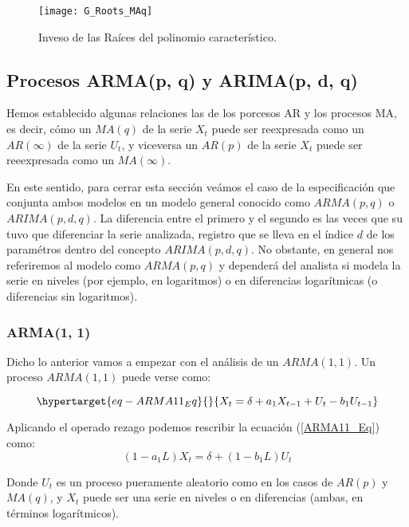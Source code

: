 \documentclass[
  a4paper,
]{article}
\begin{document}
\begin{figure}
  \centering
    \texttt{[image: G\_Roots\_MAq]}
  \caption{Inveso de las Raíces del polinomio característico.}
  \label{G_Roots_MAq}
\end{figure}

\hypertarget{procesos-armap-q-y-arimap-d-q}{%
\subsection{Procesos ARMA(p, q) y ARIMA(p, d,
q)}\label{procesos-armap-q-y-arimap-d-q}}

Hemos establecido algunas relaciones las de los porcesos AR y los
procesos MA, es decir, cómo un \(MA(q)\) de la serie \(X_t\) puede ser
reexpresada como un \(AR(\infty)\) de la serie \(U_t\), y viceversa un
\(AR(p)\) de la serie \(X_t\) puede ser reeexpresada como un
\(MA(\infty)\).

En este sentido, para cerrar esta sección veámos el caso de la
especificación que conjunta ambos modelos en un modelo general conocido
como \(ARMA(p, q)\) o \(ARIMA(p, d, q)\). La diferencia entre el primero
y el segundo es las veces que su tuvo que diferenciar la serie
analizada, registro que se lleva en el índice \(d\) de los paramétros
dentro del concepto \(ARIMA(p, d, q)\). No obstante, en general nos
referiremos al modelo como \(ARMA(p, q)\) y dependerá del analista si
modela la serie en niveles (por ejemplo, en logaritmos) o en diferencias
logarítmicas (o diferencias sin logaritmos).

\hypertarget{arma1-1}{%
\subsubsection{ARMA(1, 1)}\label{arma1-1}}

Dicho lo anterior vamos a empezar con el análisis de un \(ARMA(1, 1)\).
Un proceso \(ARMA(1, 1)\) puede verse como:

\begin{equation}\protect\hypertarget{eq-ARMA11_Eq}{}{
X_t = \delta + a_1 X_{t - 1} + U_t - b_1 U_{t - 1}
}\label{eq-ARMA11_Eq}\end{equation}

Aplicando el operado rezago podemos rescribir la ecuación
(\ref{ARMA11_Eq}) como: \[
(1 - a_1 L) X_t = \delta + (1 - b_1 L) U_t
\]

Donde \(U_t\) es un proceso pueramente aleatorio como en los casos de
\(AR(p)\) y \(MA(q)\), y \(X_t\) puede ser una serie en niveles o en
diferencias (ambas, en términos logarítmicos).
\end{document}
